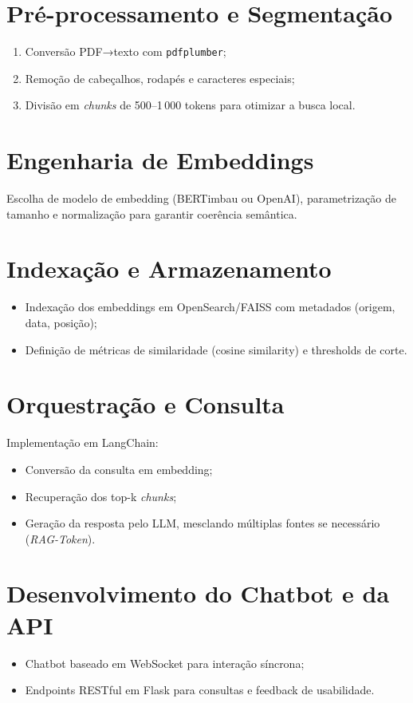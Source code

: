 \section{Pré-processamento e Segmentação}
\begin{enumerate}[label=\\arabic*.]
  \item Conversão PDF→texto com \texttt{pdfplumber};
  \item Remoção de cabeçalhos, rodapés e caracteres especiais;
  \item Divisão em \emph{chunks} de 500–1\,000 tokens para otimizar a busca local.
\end{enumerate}

\section{Engenharia de Embeddings}
Escolha de modelo de embedding (BERTimbau ou OpenAI), parametrização de tamanho e normalização para garantir coerência semântica.

\section{Indexação e Armazenamento}
\begin{itemize}[label=\textbullet]
  \item Indexação dos embeddings em OpenSearch/FAISS com metadados (origem, data, posição);
  \item Definição de métricas de similaridade (cosine similarity) e thresholds de corte.
\end{itemize}

\section{Orquestração e Consulta}
Implementação em LangChain:
\begin{itemize}[label=\textbullet]
  \item Conversão da consulta em embedding;
  \item Recuperação dos top-k \emph{chunks};
  \item Geração da resposta pelo LLM, mesclando múltiplas fontes se necessário (\emph{RAG-Token}).
\end{itemize}

\section{Desenvolvimento do Chatbot e da API}
\begin{itemize}[label=\textbullet]
  \item Chatbot baseado em WebSocket para interação síncrona;
  \item Endpoints RESTful em Flask para consultas e feedback de usabilidade.
\end{itemize}

